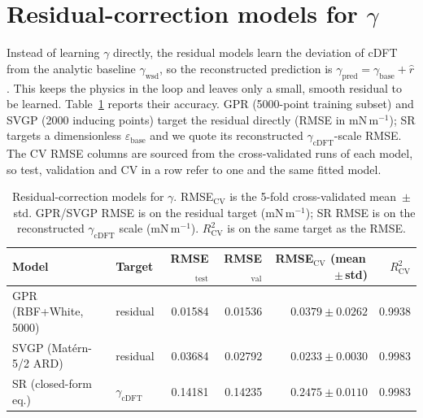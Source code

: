 \documentclass[11pt]{article}
\newcommand{\gmm}{mN\,m$^{-1}$}
\begin{document}
\section{Residual-correction models for $\gamma$}
Instead of learning $\gamma$ directly, the residual models learn the deviation
of cDFT from the analytic baseline $\gamma_\mathrm{wsd}$, so the reconstructed
prediction is $\gamma_\mathrm{pred}=\gamma_\mathrm{base}+\hat{r}$. This keeps the
physics in the loop and leaves only a small, smooth residual to be learned.
Table~\ref{tab:residual} reports their accuracy. GPR (5000-point training
subset) and SVGP (2000 inducing points) target the residual directly (RMSE in
\gmm); SR targets a dimensionless $\varepsilon_\mathrm{base}$ and we quote its
reconstructed $\gamma_\mathrm{cDFT}$-scale RMSE. The CV RMSE columns are
sourced from the cross-validated runs of each model, so test, validation and CV
in a row refer to one and the same fitted model.

\begin{table}[t]
\centering
\caption{Residual-correction models for $\gamma$. RMSE$_\mathrm{CV}$ is the 5-fold
cross-validated mean~$\pm$~std. GPR/SVGP RMSE is on the residual target (\gmm); SR
RMSE is on the reconstructed $\gamma_\mathrm{cDFT}$ scale (\gmm). $R^2_\mathrm{CV}$
is on the same target as the RMSE.}
\label{tab:residual}
\small
\begin{tabular}{llrrrr}
\toprule
Model & Target & RMSE$_\mathrm{test}$ & RMSE$_\mathrm{val}$ & RMSE$_\mathrm{CV}$ (mean\,$\pm$\,std) & $R^2_\mathrm{CV}$ \\
\midrule
GPR (RBF+White, 5000)    & residual   & 0.01584 & 0.01536 & $0.0379 \pm 0.0262$ & 0.9938 \\
SVGP (Mat\'ern-5/2 ARD)  & residual   & 0.03684 & 0.02792 & $0.0233 \pm 0.0030$ & 0.9983 \\
SR (closed-form eq.)     & $\gamma_\mathrm{cDFT}$ & 0.14181 & 0.14235 & $0.2475 \pm 0.0110$ & 0.9983 \\
\bottomrule
\end{tabular}
\end{table}

\end{document}
